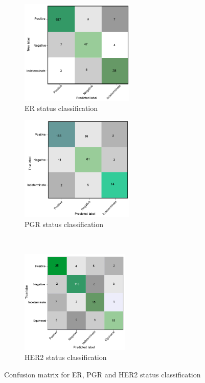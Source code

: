 \begin{figure}[h]
	\centering
	\begin{subfigure}{.49\linewidth}
		\centering
		\includegraphics[width=0.9\linewidth,height=50mm]{images/conf_er.png}
		\caption{ER status classification}
        \label{fig:er_confusion}
	\end{subfigure}
	\begin{subfigure}{.49\linewidth}
		\centering
		\includegraphics[width=0.9\linewidth,height=50mm]{images/conf_pgr.png}
		\caption{PGR status classification}
        \label{fig:pgr_confusion}
	\end{subfigure}\\[1ex]
	\begin{subfigure}{0.49\linewidth}
		\centering
		\includegraphics[width=0.9\linewidth,height=50mm]{images/conf_her2.png}
		\caption{HER2 status classification }
        \label{fig:her2_confusion}
	\end{subfigure}
	\caption{Confusion matrix for ER, PGR and HER2 status classification~\cite{karimACCESS2019}} 
	\label{fig:multi_cms}
\end{figure}


